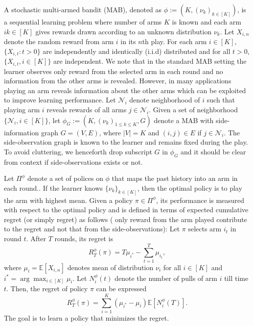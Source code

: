 A stochastic multi-armed bandit (MAB), denoted as $\phi:=(K, (\nu_k)_{k \in [K]})$, is a sequential learning problem where number of arms $K$ is known and each arm $ik \in [K]$ gives rewards drawn according to an unknown distribution $\nu_k$. Let $X_{i,n}$ denote the random reward from arm $i$ in its $n$th play. For each arm $i\in [K]$, $\{X_{i,t}: t>0\}$ are independently and identically (i.i.d) distributed and for all $t>0$, $\{X_{i,t}, i \in [K]\}$ are independent. We note that in the standard MAB setting the learner observes only reward from the selected arm in each round and no information from the other arms is revealed. However, in many applications playing an arm reveals information about the other arms which can be exploited to improve learning performance. Let $\mathcal{N}_i$  denote neighborhood of $i$ such that playing arm $i$ reveals rewards of all arms $j \in \mathcal{N}_i$.  Given a set of neighborhood $\{\mathcal{N}_i, i\in [K]\}$, let $\phi_G:=(K, (\nu_k)_{1\leq k\leq K}, G)$ denote a MAB with side-information graph $G=(V,E)$, where $|V|=K$ and $(i,j)\in E$ if $j \in \mathcal{N}_i$. The side-observation graph is known to the learner and remains fixed during the play. To avoid cluttering, we henceforth drop subscript $G$ in $\phi_G$ and it should be clear from context if side-observations exists or not. 

Let $\Pi^{\phi}$ denote a set of polices on $\phi$ that maps the past history into an arm in each round.. If the learner knows $\{\nu_k\}_{k \in [K]}$, then the optimal policy is to play the arm with highest mean. Given a policy $\pi \in \Pi^{\phi}$, its performance is measured with respect to the optimal policy and is defined in terms of expected cumulative regret (or simply regret) as follows ( only reward from the arm played contribute to the regret and not that from the side-observations):  Let $\pi$ selects arm $i_t$ in round $t$. After $T$ rounds, its regret is 
\begin{equation}
\label{eqn:BanditRegret}
R^\phi_T(\pi)= T \mu_{i^*}- \sum_{t=1}^{T}\mu_{i_t},
\end{equation} 
where $\mu_i=\mathbb{E}[X_{i,n}]$ denotes mean of distribution  $\nu_i$ for all $i\in [K]$ and  $i^*= \arg\max_{i \in [K]} \mu_i$. Let $N^\phi_i(t)$ denote the number of pulls of arm $i$ till time $t$. Then, the regret of policy $\pi$ can be expressed 
\[R^\phi_T(\pi)=\sum_{i=1}^{K}(\mu_{i^*}-\mu_i)\mathbb{E}[N^\phi_i(T)].\]
The goal is to learn a policy that minimizes the regret.  

